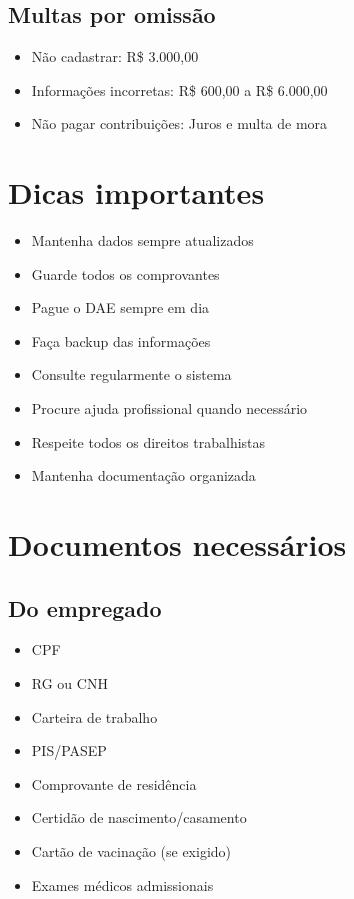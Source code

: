 \documentclass[12pt,a4paper]{article}
\begin{document}
\subsection{Multas por omissão}
\begin{itemize}
    \item Não cadastrar: R\$ 3.000,00
    \item Informações incorretas: R\$ 600,00 a R\$ 6.000,00
    \item Não pagar contribuições: Juros e multa de mora
\end{itemize}

\section{Dicas importantes}

\begin{itemize}
    \item Mantenha dados sempre atualizados
    \item Guarde todos os comprovantes
    \item Pague o DAE sempre em dia
    \item Faça backup das informações
    \item Consulte regularmente o sistema
    \item Procure ajuda profissional quando necessário
    \item Respeite todos os direitos trabalhistas
    \item Mantenha documentação organizada
\end{itemize}

\section{Documentos necessários}

\subsection{Do empregado}
\begin{itemize}
    \item CPF
    \item RG ou CNH
    \item Carteira de trabalho
    \item PIS/PASEP
    \item Comprovante de residência
    \item Certidão de nascimento/casamento
    \item Cartão de vacinação (se exigido)
    \item Exames médicos admissionais
\end{itemize}
\end{document}
